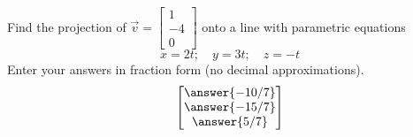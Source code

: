 \documentclass{ximera}
\author{Anna Davis}
\begin{document}
\begin{exercise}
Find the projection of $\vec{v}=\begin{bmatrix}1\\-4\\0\end{bmatrix}$ onto a line with parametric equations $$x=2t;\quad y=3t;\quad z=-t$$
Enter your answers in fraction form (no decimal approximations).
$$\begin{bmatrix}\answer{-10/7}\\\answer{-15/7}\\\answer{5/7}\end{bmatrix}$$
\end{exercise}
\end{document}
